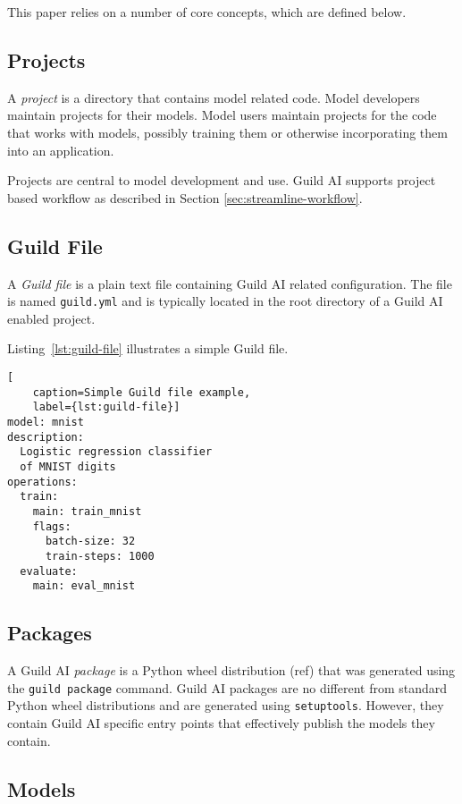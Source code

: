 \documentclass{article}
\begin{document}
This paper relies on a number of core concepts, which are defined
below.

\subsection{Projects}

A \emph{project} is a directory that contains model related
code. Model developers maintain projects for their models. Model users
maintain projects for the code that works with models, possibly
training them or otherwise incorporating them into an application.

Projects are central to model development and use. Guild AI supports
project based workflow as described in Section
\ref{sec:streamline-workflow}.

\subsection{Guild File}

A \emph{Guild file} is a plain text file containing Guild AI related
configuration. The file is named \verb|guild.yml| and is typically
located in the root directory of a Guild AI enabled project.

Listing~\ref{lst:guild-file} illustrates a simple Guild file.

\begin{lstlisting}[
    caption=Simple Guild file example,
    label={lst:guild-file}]
model: mnist
description:
  Logistic regression classifier
  of MNIST digits
operations:
  train:
    main: train_mnist
    flags:
      batch-size: 32
      train-steps: 1000
  evaluate:
    main: eval_mnist
\end{lstlisting}

\subsection{Packages}

A Guild AI \emph{package} is a Python wheel distribution (ref) that
was generated using the \verb|guild package| command. Guild AI
packages are no different from standard Python wheel distributions and
are generated using \verb|setuptools|. However, they contain Guild AI
specific entry points that effectively publish the models they
contain.

\subsection{Models}
\end{document}
